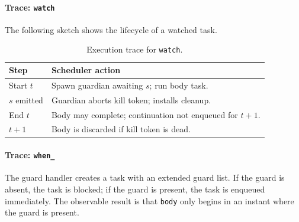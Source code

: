 \paragraph{Trace: \texttt{watch}}
The following sketch shows the lifecycle of a watched task.
\begin{table}[h]
\centering
\begin{tabularx}{\linewidth}{lY}
\hline
Step & Scheduler action \\ \hline
Start $t$ & Spawn guardian awaiting $s$; run body task. \\
$s$ emitted & Guardian aborts kill token; installs cleanup. \\
End $t$ & Body may complete; continuation not enqueued for $t{+}1$. \\
$t{+}1$ & Body is discarded if kill token is dead. \\ \hline
\end{tabularx}
\caption{Execution trace for \texttt{watch}.}
\end{table}

\paragraph{Trace: \texttt{when\_}}
The guard handler creates a task with an extended guard list. If the guard is
absent, the task is blocked; if the guard is present, the task is enqueued
immediately. The observable result is that \texttt{body} only begins in an
instant where the guard is present.

